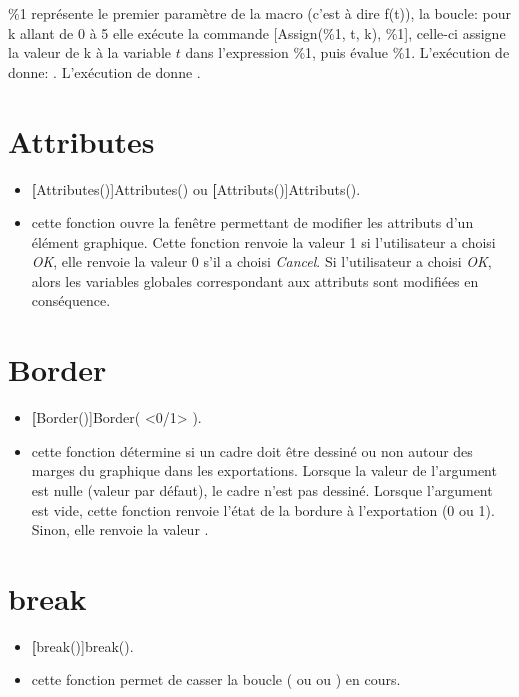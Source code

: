 \centerline{}

\%1 représente le premier paramètre de la macro (c'est à dire f(t)), la boucle: pour k allant de 0 à 5 elle exécute la commande [Assign(\%1, t, k), \%1], celle-ci assigne la valeur de k à la variable $t$ dans l'expression \%1, puis évalue \%1. L'exécution de  donne: \res{[0,1,4,9,16,25]}. L'exécution de  donne \Nil. 


\section{Attributes}\label{cmdAttributs}

\begin{itemize}
 \item \util \textbf[Attributes()]{Attributes()} ou \textbf[Attributs()]{Attributs()}.
 \item \desc cette fonction ouvre la fenêtre permettant de modifier les attributs d'un élément graphique. Cette fonction renvoie la valeur 1 si l'utilisateur a choisi \textit{OK}, elle renvoie la valeur 0 s'il a choisi \textit{Cancel}. Si l'utilisateur a choisi \textit{OK}, alors les variables globales correspondant aux attributs sont modifiées en conséquence.
\end{itemize}

\section{Border}\label{cmdBorder}

\begin{itemize}
 \item \util \textbf[Border()]{Border( <0/1> )}.
 \item \desc cette fonction détermine si un cadre doit être dessiné ou non autour des marges du graphique dans les exportations. Lorsque la valeur de l'argument est nulle (valeur par défaut), le cadre n'est pas dessiné. Lorsque l'argument est vide, cette fonction renvoie l'état de la bordure à l'exportation (0 ou 1). Sinon, elle renvoie la valeur \Nil.
\end{itemize}

\section{break}\label{cmdbreak}

\begin{itemize}
 \item \util \textbf[break()]{break()}.
 \item \desc cette fonction permet de casser la boucle ( ou  ou ) en cours.
\end{itemize}


